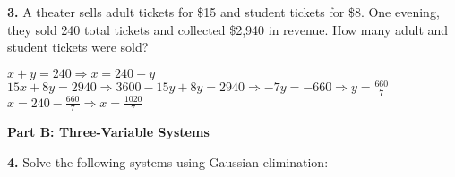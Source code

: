 \documentclass[12pt]{article}
\begin{document}
\textbf{3.} A theater sells adult tickets for \$15 and student tickets for \$8. One evening, they sold 240 total tickets and collected \$2,940 in revenue. How many adult and student tickets were sold?
\\[8pt]
\begin{minipage}[t][4cm][t]{\linewidth}
    $\displaystyle x+y=240 \Rightarrow x=240-y$
    \\[8pt] $15x+8y=2940 \Rightarrow 3600-15y+8y=2940 \Rightarrow -7y=-660 \Rightarrow y=\frac{660}{7}$
    \\[8pt] $x=240-\frac{660}{7} \Rightarrow x=\frac{1020}{7}$
\end{minipage}

\newpage

\textbf{Part B: Three-Variable Systems}

\textbf{4.} Solve the following systems using Gaussian elimination:
\end{document}

